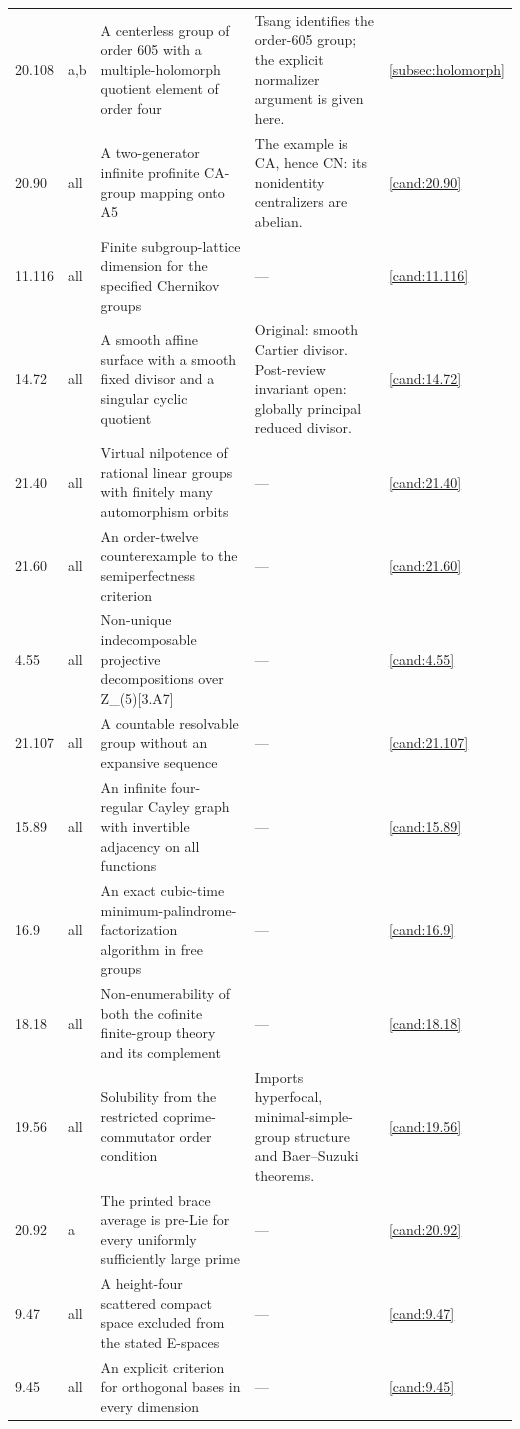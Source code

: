 \begin{longtable}{@{}p{}p{}>{\raggedright\arraybackslash}p{}>{\raggedright\arraybackslash}p{}p{}@{}}
20.108 & a,b & A centerless group of order 605 with a multiple-holomorph quotient element of order four & Tsang identifies the order-605 group; the explicit normalizer argument is given here. & \ref{subsec:holomorph} \\
20.90 & all & A two-generator infinite profinite CA-group mapping onto A5 & The example is CA, hence CN: its nonidentity centralizers are abelian. & \ref{cand:20.90} \\
11.116 & all & Finite subgroup-lattice dimension for the specified Chernikov groups & --- & \ref{cand:11.116} \\
14.72 & all & A smooth affine surface with a smooth fixed divisor and a singular cyclic quotient & Original: smooth Cartier divisor. Post-review invariant open: globally principal reduced divisor. & \ref{cand:14.72} \\
21.40 & all & Virtual nilpotence of rational linear groups with finitely many automorphism orbits & --- & \ref{cand:21.40} \\
21.60 & all & An order-twelve counterexample to the semiperfectness criterion & --- & \ref{cand:21.60} \\
4.55 & all & Non-unique indecomposable projective decompositions over Z\_(5)[3.A7] & --- & \ref{cand:4.55} \\
21.107 & all & A countable resolvable group without an expansive sequence & --- & \ref{cand:21.107} \\
15.89 & all & An infinite four-regular Cayley graph with invertible adjacency on all functions & --- & \ref{cand:15.89} \\
16.9 & all & An exact cubic-time minimum-palindrome-factorization algorithm in free groups & --- & \ref{cand:16.9} \\
18.18 & all & Non-enumerability of both the cofinite finite-group theory and its complement & --- & \ref{cand:18.18} \\
19.56 & all & Solubility from the restricted coprime-commutator order condition & Imports hyperfocal, minimal-simple-group structure and Baer--Suzuki theorems. & \ref{cand:19.56} \\
20.92 & a & The printed brace average is pre-Lie for every uniformly sufficiently large prime & --- & \ref{cand:20.92} \\
9.47 & all & A height-four scattered compact space excluded from the stated E-spaces & --- & \ref{cand:9.47} \\
9.45 & all & An explicit criterion for orthogonal bases in every dimension & --- & \ref{cand:9.45} \\

\end{longtable}
